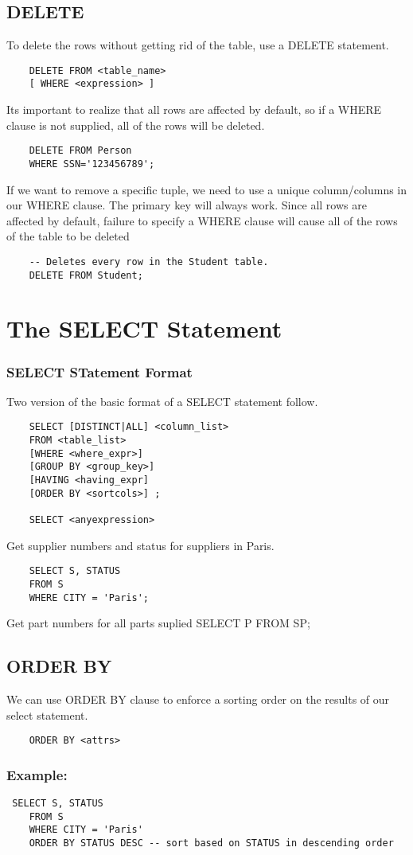 \documentclass{report}
\begin{document}
    \subsection{DELETE}
    To delete the rows without getting rid of the table, use a DELETE statement.
    \begin{verbatim}
    DELETE FROM <table_name> 
    [ WHERE <expression> ]
    \end{verbatim}
    Its important to realize that all rows are affected by default, so if a WHERE clause is not supplied, all of the rows will be deleted.
    \begin{verbatim}
    DELETE FROM Person 
    WHERE SSN='123456789';
    \end{verbatim}
    If we want to remove a specific tuple, we need to use a unique column/columns in our WHERE clause. The primary key will always work.
    \bigbreak \noindent
    Since all rows are affected by default, failure to specify a WHERE clause will cause all of the rows of the table to be deleted
    \begin{verbatim}
    -- Deletes every row in the Student table.
    DELETE FROM Student;
    \end{verbatim}
    \section{The SELECT Statement}
    \subsubsection{SELECT STatement Format}
    Two version of the basic format of a SELECT statement follow.
    \begin{verbatim}
    SELECT [DISTINCT|ALL] <column_list>
    FROM <table_list>
    [WHERE <where_expr>]
    [GROUP BY <group_key>]
    [HAVING <having_expr]
    [ORDER BY <sortcols>] ;

    SELECT <anyexpression>
    \end{verbatim}
    Get supplier numbers and status for suppliers in Paris.
\begin{verbatim}
    SELECT S, STATUS    
    FROM S
    WHERE CITY = 'Paris';
    \end{verbatim}
    Get part numbers for all parts suplied
    SELECT P FROM SP;
    \subsection{ORDER BY}
    We can use ORDER BY clause to enforce a sorting order on the results of our select statement.
    \begin{verbatim}
    ORDER BY <attrs>
    \end{verbatim}
    \subsubsection*{Example:}
    \begin{verbatim} SELECT S, STATUS 
    FROM S
    WHERE CITY = 'Paris'
    ORDER BY STATUS DESC -- sort based on STATUS in descending order
    \end{verbatim}
\end{document}
